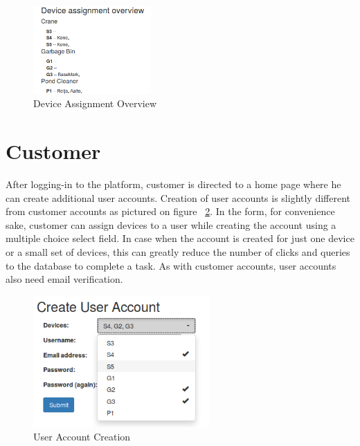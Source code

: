 \begin{figure}[ht]
	\begin{center}
		\includegraphics[width=0.4\textwidth]{images/implementation/DeviceAssignment}
		\caption{Device Assignment Overview}
		\label{fig:DeviceAssignment}
	\end{center}
\end{figure}


\section{Customer}

 After logging-in to the platform, customer is directed to a home page where he can create additional user accounts. Creation of user accounts is slightly different from customer accounts as pictured on figure ~\ref{fig:CreateUser}. In the form, for convenience sake, customer can assign devices to a user while creating the account using a multiple choice select field. In case when the account is created for just one device or a small set of devices, this can greatly reduce the number of clicks and queries to the database to complete a task. As with customer accounts, user accounts also need email verification.

\begin{figure}[ht]
	\begin{center}
		\includegraphics[width=0.6\textwidth]{images/implementation/CreateUser}
		\caption{User Account Creation}
		\label{fig:CreateUser}
	\end{center}
\end{figure}

